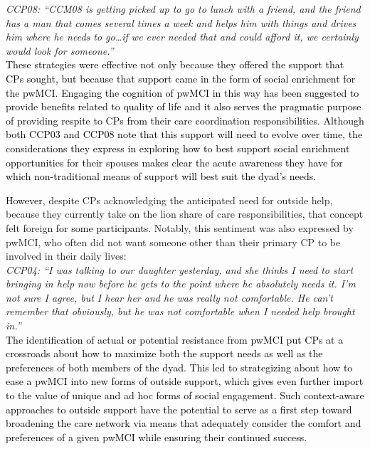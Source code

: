 \documentclass[acmsmall]{acmart}
\begin{document}
\textit{CCP08: “CCM08 is getting picked up to go to lunch with a friend, and the friend has a man that comes several times a week and helps him with things and drives him where he needs to go…if we ever needed that and could afford it, we certainly would look for someone.”}
\\

\textcolor{black}{These strategies were effective not only because they offered the support that CPs sought, but because that support came in the form of social enrichment for the pwMCI. Engaging the cognition of pwMCI in this way has been suggested to provide benefits related to quality of life \cite{lydon2022integrative, dean2012living} and it also serves the pragmatic purpose of providing respite to CPs from their care coordination responsibilities. Although both CCP03 and CCP08 note that this support will need to evolve over time, the considerations they express in exploring how to best support social enrichment opportunities for their spouses makes clear the acute awareness they have for which non-traditional means of support will best suit the dyad’s needs.}

\textcolor{black}{However,} despite CPs acknowledging the anticipated need for outside help, because they currently take on the lion share of care responsibilities, that concept felt foreign \textcolor{black}{for some participants}. Notably, this sentiment was also expressed by pwMCI, who often did not want someone other than their primary CP to be involved in their daily lives:  
\\


\textit{CCP04: “I was talking to our daughter yesterday, and she thinks I need to start bringing in help now before he gets to the point where he absolutely needs it. I'm not sure I agree, but I hear her and he was really not comfortable. He can't remember that obviously, but he was not comfortable when I needed help brought in.”}
\\

\textcolor{black}{The identification of actual or potential resistance from pwMCI put CPs at a crossroads about how to maximize both the support needs as well as the preferences of both members of the dyad. This led to strategizing about how to ease a pwMCI into new forms of outside support, which gives even further import to the value of unique and ad hoc forms of social engagement. Such context-aware approaches to outside support have the potential to serve as a first step toward broadening the care network via means that adequately consider the comfort and preferences of a given pwMCI while ensuring their continued success.}
\end{document}
